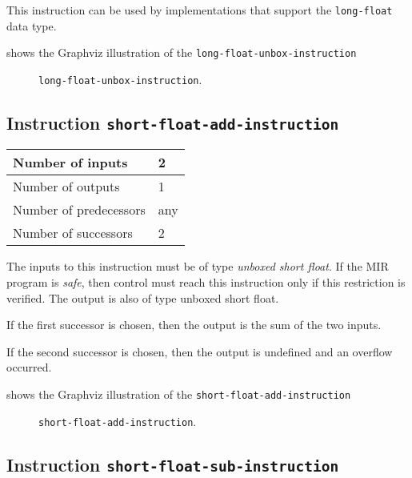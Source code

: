 This instruction can be used by implementations that support the
\texttt{long-float} data type.   

 shows the Graphviz illustration of the
\texttt{long-float-unbox-instruction}

\begin{figure}
\begin{center}
\end{center}
\caption{\label{fig-long-float-unbox-instruction}
\texttt{long-float-unbox-instruction}.}
\end{figure}

\subsection{Instruction \texttt{short-float-add-instruction}}
\label{mir-instruction-short-float-add}

\begin{tabular}{|l|l|}
\hline
Number of inputs & 2\\
\hline
Number of outputs & 1\\
\hline
Number of predecessors & any\\
\hline
Number of successors & 2\\
\hline
\end{tabular}

The inputs to this instruction must be of type \emph{unboxed short
  float}.  If the MIR program is \emph{safe}, then control must reach
this instruction only if this restriction is verified.  The output is
also of type unboxed short float.

If the first successor is chosen, then the output is
the sum of the two inputs.  

If the second successor is chosen, then the output is undefined and an
overflow occurred. 

 shows the Graphviz illustration of the
\texttt{short-float-add-instruction}

\begin{figure}
\begin{center}
\end{center}
\caption{\label{fig-short-float-add-instruction}
\texttt{short-float-add-instruction}.}
\end{figure}

\subsection{Instruction \texttt{short-float-sub-instruction}}
\label{mir-instruction-short-float-sub}

